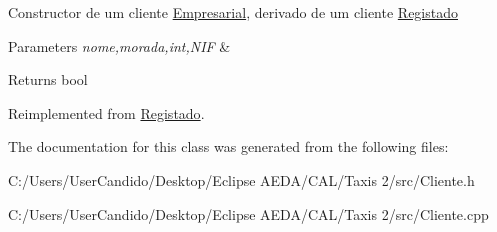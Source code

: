 Constructor de um cliente \hyperlink{class_empresarial}{Empresarial}, derivado de um cliente \hyperlink{class_registado}{Registado}


\begin{DoxyParams}{Parameters}
{\em nome,morada,int,N\+IF} & \\
\hline
\end{DoxyParams}
\begin{DoxyReturn}{Returns}
bool 
\end{DoxyReturn}


Reimplemented from \hyperlink{class_registado}{Registado}.



The documentation for this class was generated from the following files\+:\begin{DoxyCompactItemize}
\item 
C\+:/\+Users/\+User\+Candido/\+Desktop/\+Eclipse A\+E\+D\+A/\+C\+A\+L/\+Taxis 2/src/Cliente.\+h\item 
C\+:/\+Users/\+User\+Candido/\+Desktop/\+Eclipse A\+E\+D\+A/\+C\+A\+L/\+Taxis 2/src/Cliente.\+cpp\end{DoxyCompactItemize}
